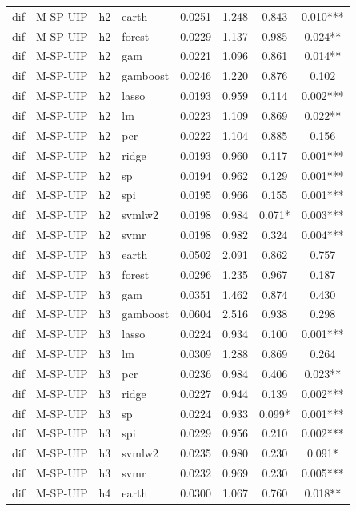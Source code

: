 \begin{ThreePartTable}
\begin{longtable}[t]{llclcccc}
dif & M-SP-UIP & h2 & earth & 0.0251 & 1.248 & 0.843 & 0.010***\\
dif & M-SP-UIP & h2 & forest & 0.0229 & 1.137 & 0.985 & 0.024**\\
dif & M-SP-UIP & h2 & gam & 0.0221 & 1.096 & 0.861 & 0.014**\\
dif & M-SP-UIP & h2 & gamboost & 0.0246 & 1.220 & 0.876 & 0.102\\
dif & M-SP-UIP & h2 & lasso & 0.0193 & 0.959 & 0.114 & 0.002***\\
dif & M-SP-UIP & h2 & lm & 0.0223 & 1.109 & 0.869 & 0.022**\\
dif & M-SP-UIP & h2 & pcr & 0.0222 & 1.104 & 0.885 & 0.156\\
dif & M-SP-UIP & h2 & ridge & 0.0193 & 0.960 & 0.117 & 0.001***\\
dif & M-SP-UIP & h2 & sp & 0.0194 & 0.962 & 0.129 & 0.001***\\
dif & M-SP-UIP & h2 & spi & 0.0195 & 0.966 & 0.155 & 0.001***\\
dif & M-SP-UIP & h2 & svmlw2 & 0.0198 & 0.984 & 0.071* & 0.003***\\
dif & M-SP-UIP & h2 & svmr & 0.0198 & 0.982 & 0.324 & 0.004***\\
\addlinespace
dif & M-SP-UIP & h3 & earth & 0.0502 & 2.091 & 0.862 & 0.757\\
dif & M-SP-UIP & h3 & forest & 0.0296 & 1.235 & 0.967 & 0.187\\
dif & M-SP-UIP & h3 & gam & 0.0351 & 1.462 & 0.874 & 0.430\\
dif & M-SP-UIP & h3 & gamboost & 0.0604 & 2.516 & 0.938 & 0.298\\
dif & M-SP-UIP & h3 & lasso & 0.0224 & 0.934 & 0.100 & 0.001***\\
dif & M-SP-UIP & h3 & lm & 0.0309 & 1.288 & 0.869 & 0.264\\
dif & M-SP-UIP & h3 & pcr & 0.0236 & 0.984 & 0.406 & 0.023**\\
dif & M-SP-UIP & h3 & ridge & 0.0227 & 0.944 & 0.139 & 0.002***\\
dif & M-SP-UIP & h3 & sp & 0.0224 & 0.933 & 0.099* & 0.001***\\
dif & M-SP-UIP & h3 & spi & 0.0229 & 0.956 & 0.210 & 0.002***\\
dif & M-SP-UIP & h3 & svmlw2 & 0.0235 & 0.980 & 0.230 & 0.091*\\
dif & M-SP-UIP & h3 & svmr & 0.0232 & 0.969 & 0.230 & 0.005***\\
\addlinespace
dif & M-SP-UIP & h4 & earth & 0.0300 & 1.067 & 0.760 & 0.018**\\

\end{longtable}
\end{ThreePartTable}
